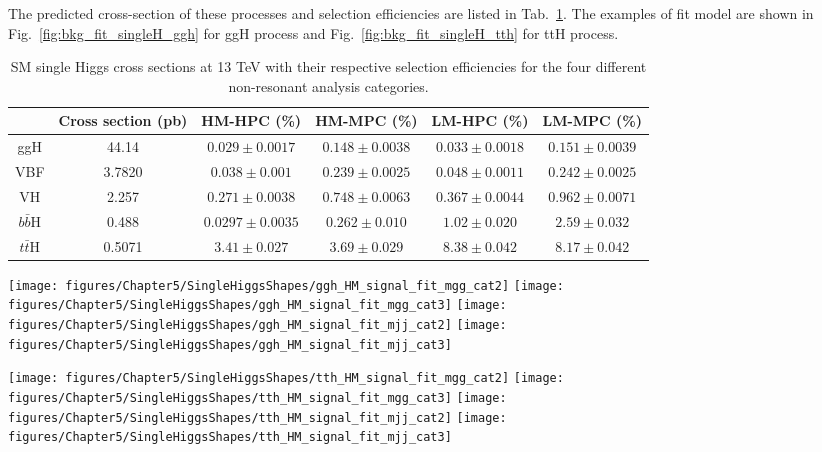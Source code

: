 The predicted cross-section of these processes and selection efficiencies are listed in Tab.~\ref{tab:smsingleh}.
The examples of fit model are shown in Fig.~\ref{fig:bkg_fit_singleH_ggh} for ggH process and Fig.~\ref{fig:bkg_fit_singleH_tth} for ttH process.

\begin{table}[h]
	\caption{SM single Higgs cross sections at 13 TeV with their respective selection efficiencies for the four different non-resonant analysis categories.}
	{\small
		\centering
		\begin{tabular}{c | c | c | c | c | c }
		 & Cross section (pb) & HM-HPC (\%) & HM-MPC (\%) & LM-HPC (\%) & LM-MPC (\%)\\ \hline
		ggH & 44.14 & $0.029\pm0.0017$ & $0.148\pm0.0038$ & $0.033\pm0.0018$ & $0.151\pm0.0039$  \\
		VBF & 3.7820 & $0.038\pm0.001$ & $0.239\pm0.0025$ & $0.048\pm0.0011$ & $0.242\pm0.0025$ \\
		VH & 2.257 & $0.271\pm0.0038$ & $0.748\pm0.0063$ & $0.367\pm0.0044$ & $0.962\pm0.0071$ \\
		$b\bar{b}$H & 0.488  & $0.0297\pm0.0035$  & $0.262\pm0.010$  & $1.02\pm0.020$  &  $2.59\pm0.032$ \\
		$t\bar{t}$H & 0.5071 & $3.41\pm0.027$ & $3.69\pm0.029$ & $8.38\pm0.042$ & $8.17\pm0.042$ 
		\end{tabular}
	}
	\label{tab:smsingleh}
\end{table}

\begin{figure*}[!htbp]
  \centering
  \texttt{[image: figures/Chapter5/SingleHiggsShapes/ggh\_HM\_signal\_fit\_mgg\_cat2]}\hfil
  \texttt{[image: figures/Chapter5/SingleHiggsShapes/ggh\_HM\_signal\_fit\_mgg\_cat3]}\hfil
  \texttt{[image: figures/Chapter5/SingleHiggsShapes/ggh\_HM\_signal\_fit\_mjj\_cat2]}\hfil
  \texttt{[image: figures/Chapter5/SingleHiggsShapes/ggh\_HM\_signal\_fit\_mjj\_cat3]}\hfil
  \caption{The modeling for single Higgs production through gluon-gluon fusion in high mass, high purity (left) and medium purity (right) region.
  Top plots are the projections in $m_{\gamma\gamma}$ and bottom plots are the projections in $m_{jj}$.}
  \label{fig:bkg_fit_singleH_ggh}
\end{figure*}

\begin{figure*}[!htbp]
  \centering
  \texttt{[image: figures/Chapter5/SingleHiggsShapes/tth\_HM\_signal\_fit\_mgg\_cat2]}\hfil
  \texttt{[image: figures/Chapter5/SingleHiggsShapes/tth\_HM\_signal\_fit\_mgg\_cat3]}\hfil
  \texttt{[image: figures/Chapter5/SingleHiggsShapes/tth\_HM\_signal\_fit\_mjj\_cat2]}\hfil
  \texttt{[image: figures/Chapter5/SingleHiggsShapes/tth\_HM\_signal\_fit\_mjj\_cat3]}\hfil
  \caption{The modeling for single Higgs production associated with a pair of top quarks in high mass, high purity (left) and medium purity (right) region.
  Top plots are the projections in $m_{\gamma\gamma}$ and bottom plots are the projections in $m_{jj}$.}
  \label{fig:bkg_fit_singleH_tth}
\end{figure*}

